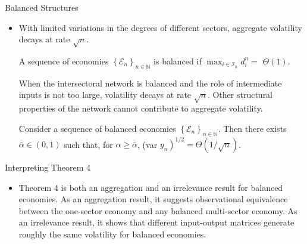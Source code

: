 \documentclass[dvipsnames]{beamer}
\begin{document}
\begin{frame}{Balanced Structures}
  \begin{itemize}
  \item With limited variations in the degrees of different sectors, aggregate volatility decays at rate $\sqrt{n}$.
    \begin{definition}
       A sequence of economies $\left\{\mathcal{E}_{n}\right\}_{n \in \mathbb{N}}$ is balanced if $\max _{i \in \mathcal{I}_{n}} d_{i}^{n}=$ $\Theta(1)$.
    \end{definition}
    \vitem When the intersectoral network is balanced and the role of intermediate inputs is not too large, volatility decays at rate $\sqrt{n}$.
    \vitem Other structural properties of the network cannot contribute to aggregate volatility.
    \begin{theorem}[Theorem 4]
       Consider a sequence of balanced economies $\left\{\mathcal{E}_{n}\right\}_{n \in \mathbb{N}}$. Then there exists $\bar{\alpha} \in(0,1)$ such that, for $\alpha \geq \bar{\alpha}$, (var $\left.y_{n}\right)^{1 / 2}=\Theta(1 / \sqrt{n})$.
    \end{theorem}
  \end{itemize}
\end{frame}
%
\begin{frame}{Interpreting Theorem 4}
  \begin{itemize}
  \item Theorem 4 is both an aggregation and an irrelevance result for balanced economies.
    \vitem As an aggregation result, it suggests observational equivalence between the one-sector economy and any balanced multi-sector economy.
    \vitem As an irrelevance result, it shows that different input-output matrices generate roughly the same volatility for balanced economies.
  \end{itemize}
\end{frame}
\end{document}
